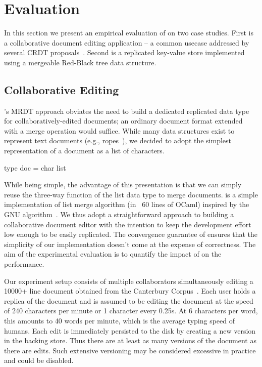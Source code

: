 \section{Evaluation}
\label{sec:eval}

In this section we present an empirical evaluation of \quark on two
case studies. First is a collaborative document editing
application -- a common usecase addressed by several CRDT
proposals~\cite{rga, treedoc, crdts}. Second is a replicated key-value
store implemented using a mergeable Red-Black tree data structure.

\subsection{Collaborative Editing}

\quark's MRDT approach obviates the need to build a dedicated
replicated data type for collaboratively-edited documents; an ordinary
document format extended with a merge operation would suffice. While
many data structures exist to represent text documents (e.g.,
ropes~\cite{boehm95}), we decided to adopt the simplest representation
of a document as a list of characters. 
\begin{center}
\begin{ocaml}
        type doc = char list
\end{ocaml}
\end{center}
While being simple, the advantage of this presentation is that we can
simply reuse the three-way  function of the list data
type to merge documents.  is a simple implementation of
list merge algorithm (in ~60 lines of OCaml) inspired by the GNU
 algorithm~\cite{gnudiff}. We thus adopt a straightforward
approach to building a collaborative document editor with the
intention to keep the development effort low enough to be easily
replicated. The convergence guarantee of \quark ensures that the
simplicity of our implementation doesn't come at the expense of
correctness. The aim of the experimental evaluation is to quantify the
impact of \quark on the performance.

Our experiment setup consists of multiple collaborators simultaneously
editing a 10000+ line document obtained from the Canterbury
Corpus~\cite{canterbury}. Each user holds a replica of the document
and is assumed to be editing the document at the speed of 240
characters per minute or 1 character every 0.25s. At 6 characters per
word, this amounts to 40 words per minute, which is the average typing
speed of humans. Each edit is immediately persisted to the disk by
creating a new version in the backing store. Thus there are at least
as many versions of the document as there are edits. Such extensive
versioning may be considered excessive in practice and could be
disabled. 

